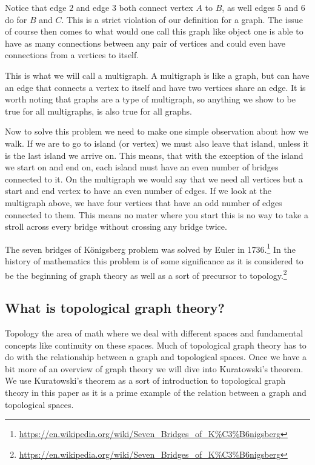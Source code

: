 \documentclass{article}
\begin{document}
Notice that edge $2$ and edge $3$ both connect vertex $A$ to $B$, as well edges $5$ and $6$ do for $B$ and $C$. This is a strict violation of our definition for a graph. The issue of course then comes to what would one call this graph like object one is able to have as many connections between any pair of vertices and could even have connections from a vertices to itself.

This is what we will call a multigraph. A multigraph is like a graph, but can have an edge that connects a vertex to itself and have two vertices share an edge. It is worth noting that graphs are a type of multigraph, so anything we show to be true for all multigraphs, is also true for all graphs.

Now to solve this problem we need to make one simple observation about how we walk. If we are to go to island (or vertex) we must also leave that island, unless it is the last island we arrive on. This means, that with the exception of the island we start on and end on, each island must have an even number of bridges connected to it. On the multigraph we would say that we need all vertices but a start and end vertex to have an even number of edges. If we look at the multigraph above, we have four vertices that have an odd number of edges connected to them. This means no mater where you start this is no way to take a stroll across every bridge without crossing any bridge twice.

The seven bridges of K\"onigsberg problem was solved by Euler in 1736.\footnote{\url{https://en.wikipedia.org/wiki/Seven_Bridges_of_K\%C3\%B6nigsberg}} In the history of mathematics this problem is of some significance as it is considered to be the beginning of graph theory as well as a sort of precursor to topology.\footnote{\url{https://en.wikipedia.org/wiki/Seven_Bridges_of_K\%C3\%B6nigsberg}}

\subsection{What is topological graph theory?}

Topology the area of math where we deal with different spaces and fundamental concepts like continuity on these spaces. Much of topological graph theory has to do with the relationship between a graph and topological spaces. Once we have a bit more of an overview of graph theory we will dive into Kuratowski's theorem. We use Kuratowski's theorem as a sort of introduction to topological graph theory in this paper as it is a prime example of the relation between a graph and topological spaces.
\end{document}
